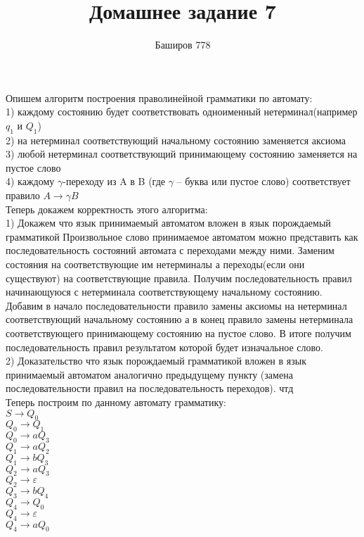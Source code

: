 \documentclass[a4paper,12pt]{article}
\author{Баширов 778}
\title{Домашнее задание 7}
\begin{document}
\maketitle
\newpage

\section{}
Опишем алгоритм построения праволинейной грамматики по автомату:\\
1) каждому состоянию будет соответствовать одноименный нетерминал(например $q_1$ и $Q_1$)\\
2) на нетерминал соответствующий начальному состоянию заменяется аксиома\\
3) любой нетерминал соответствующий принимающему состоянию заменяется на пустое слово\\
4) каждому $\gamma$-переходу из A в B (где $\gamma$ -- буква или пустое слово) соответствует правило $A \rightarrow \gamma B$\\
Теперь докажем корректность этого алгоритма:\\
1) Докажем что язык принимаемый автоматом вложен в язык порождаемый грамматикой
Произвольное слово принимаемое автоматом можно представить как последовательность состояний автомата с переходами между ними. Заменим состояния на соответствующие им нетерминалы а переходы(если они существуют) на соответствующие правила. Получим последовательность правил начинающуюся с нетерминала соответствующему начальному состоянию. Добавим в начало последовательности правило замены аксиомы на нетерминал соответствующий начальному состоянию а в конец правило замены нетерминала соответствующего принимающему состоянию на пустое слово. В итоге получим последовательность правил результатом которой будет изначальное слово.\\
2) Доказательство что язык порождаемый грамматикой вложен в язык принимаемый автоматом аналогично предыдущему пункту (замена последовательности правил на последовательность переходов).
чтд\\
Теперь построим по данному автомату грамматику:\\
$S\rightarrow Q_0$\\
$Q_0\rightarrow Q_1$\\
$Q_0\rightarrow aQ_3$\\
$Q_1\rightarrow aQ_2$\\
$Q_1\rightarrow bQ_3$\\
$Q_2\rightarrow aQ_3$\\
$Q_2\rightarrow \varepsilon$\\
$Q_3\rightarrow bQ_4$\\
$Q_4\rightarrow Q_0$\\
$Q_4\rightarrow \varepsilon$\\
$Q_4\rightarrow aQ_0$\\
\end{document}
